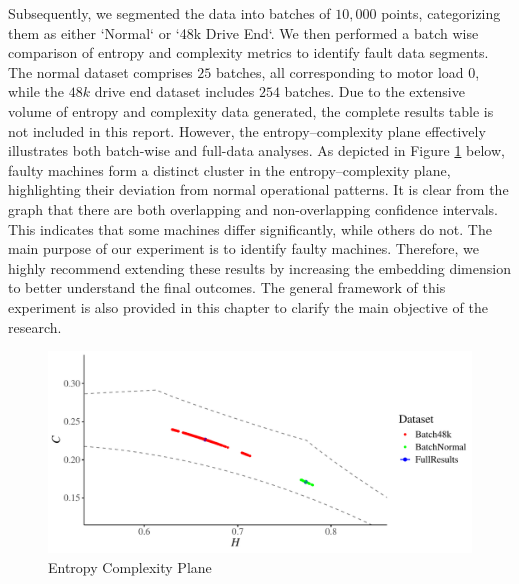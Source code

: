 Subsequently, we segmented the data into batches of $10,000$ points, categorizing them as either `Normal` or `48k Drive End`. We then performed a batch wise comparison of entropy and complexity metrics to identify fault data segments. 
The normal dataset comprises $25$ batches, all corresponding to motor load $0$, while the $48k$ drive end dataset includes $254$ batches. Due to the extensive volume of entropy and complexity data generated, the complete results table is not included in this report. However, the entropy–complexity plane effectively illustrates both batch-wise and full-data analyses. As depicted in Figure \ref{fig:EntopyComplexity Plane} below, faulty machines form a distinct cluster in the entropy–complexity plane, highlighting their deviation from normal operational patterns. 
It is clear from the graph that there are both overlapping and non-overlapping confidence intervals. This indicates that some machines differ significantly, while others do not. The main purpose of our experiment is to identify faulty machines. Therefore, we highly recommend extending these results by increasing the embedding dimension to better understand the final outcomes. The general framework of this experiment is also provided in this chapter to clarify the main objective of the research.

\begin{figure}[hbt]
	\centering
	\includegraphics[width=0.8 \textwidth]{confidence_interval}
	\caption{Entropy Complexity Plane}
	\label{fig:EntopyComplexity Plane}
\end{figure}

